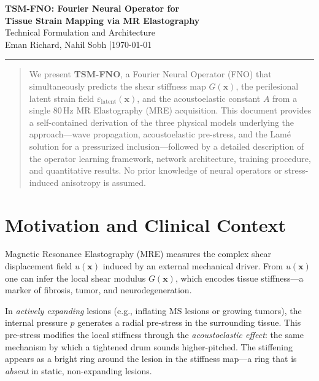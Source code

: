 \documentclass[11pt,letterpaper]{article}
\newcommand{\xvec}{\bm{x}}
\newcommand{\eps}{\varepsilon_{\mathrm{latent}}}
\begin{document}
\begin{center}
    {\LARGE\bfseries\color{blue1}
    TSM-FNO: Fourier Neural Operator for\\[4pt]
    Tissue Strain Mapping via MR Elastography}\\[10pt]
    {\large Technical Formulation and Architecture}\\[6pt]
    {\normalsize Eman Richard, Nahil Sobh \quad|\quad \today}
\end{center}

\vspace{-4pt}
\hrule height 1.5pt
\vspace{8pt}

\begin{abstract}
We present \textbf{TSM-FNO}, a Fourier Neural Operator (FNO) that simultaneously predicts the
shear stiffness map $G(\xvec)$, the perilesional latent strain field $\eps(\xvec)$, and the
acoustoelastic constant $A$ from a single 80\,Hz MR Elastography (MRE) acquisition.
This document provides a self-contained derivation of the three physical models underlying
the approach---wave propagation, acoustoelastic pre-stress, and the Lam\'{e} solution for a
pressurized inclusion---followed by a detailed description of the operator learning framework,
network architecture, training procedure, and quantitative results. No prior knowledge of
neural operators or stress-induced anisotropy is assumed.
\end{abstract}

\tableofcontents
\newpage

\section{Motivation and Clinical Context}

Magnetic Resonance Elastography (MRE) measures the complex shear displacement field
$u(\xvec)$ induced by an external mechanical driver. From $u(\xvec)$ one can infer the local
shear modulus $G(\xvec)$, which encodes tissue stiffness---a marker of fibrosis, tumor, and
neurodegeneration.

In \emph{actively expanding} lesions (e.g., inflating MS lesions or growing tumors), the
internal pressure $p$ generates a radial pre-stress in the surrounding tissue. This
pre-stress modifies the local stiffness through the \emph{acoustoelastic effect}: the same
mechanism by which a tightened drum sounds higher-pitched. The stiffening appears as a
bright ring around the lesion in the stiffness map---a ring that is \emph{absent} in
static, non-expanding lesions.
\end{document}
